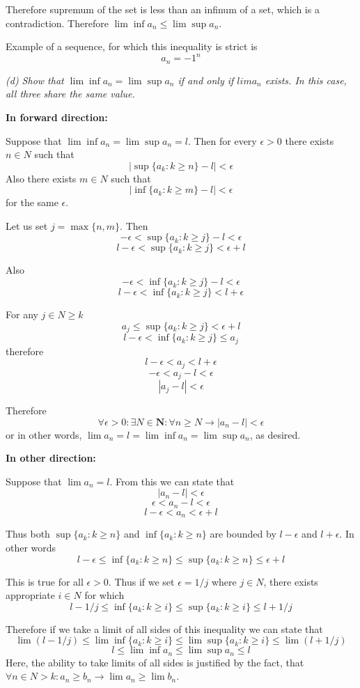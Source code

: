 \documentclass[11pt,oneside,titlepage]{book}
\begin{document}
Therefore supremum of the set is less than an infinum of a set, which is
a contradiction. Therefore $\lim\inf a_n \leq \lim \sup a_n$.

Example of a sequence, for which this inequality is strict is
$$a_n = -1^n$$

\textit{(d) Show that $\lim \inf a_n = \lim \sup a_n$ if and only if
  $lim a_n$ exists. In this case, all three share the same value.}

\textbf{In forward direction:}

Suppose that $\lim \inf a_n = \lim \sup a_n = l$. Then for every $\epsilon > 0$
there exists $n \in N$ such that
$$|\sup \{a_k: k \geq n\} - l| < \epsilon$$
Also there exists $m \in N$ such that 
$$|\inf \{a_k: k \geq m\} - l| < \epsilon$$
for the same $\epsilon$.

Let us set $j = \max\{n, m\}$. Then
$$-\epsilon < \sup \{a_k: k \geq j\} - l < \epsilon$$
$$ l - \epsilon < \sup \{a_k: k \geq j\} < \epsilon + l$$

Also
$$-\epsilon < \inf \{a_k: k \geq j\} - l < \epsilon$$
$$l - \epsilon < \inf \{a_k: k \geq j\} < l + \epsilon$$

For any $j \in N \geq k$
$$a_j \leq \sup \{a_k: k \geq j\} < \epsilon + l$$
$$l - \epsilon < \inf \{a_k: k \geq j\} \leq a_j$$
therefore
$$l - \epsilon < a_j < l + \epsilon$$
$$ - \epsilon < a_j - l <  \epsilon$$
$$|a_j - l| <  \epsilon$$

Therefore 
$$\forall \epsilon > 0: \exists N \in \textbf{N}: \forall n \geq N \to
|a_n - l| < \epsilon$$
or in other words, $\lim a_n = l = \lim \inf a_n = \lim \sup a_n$, as desired.

\textbf{In other direction: }

Suppose that $\lim a_n = l$. From this we can state that
$$|a_n - l| < \epsilon$$
$$ \epsilon < a_n - l < \epsilon$$
$$l - \epsilon < a_n  < \epsilon + l$$

Thus both $\sup \{a_k: k \geq n\}$ and $\inf \{a_k: k \geq n\}$
are bounded by $l - \epsilon$ and $l + \epsilon$. In other words
$$l - \epsilon \leq  \inf \{a_k: k \geq n\} \leq \sup \{a_k: k \geq n\} \leq \epsilon + l$$

This is true for all $\epsilon > 0$. Thus if we set $\epsilon = 1/j$
where $j \in N$, there exists appropriate $i \in N$ for which
$$l - 1/j \leq  \inf \{a_k: k \geq i\} \leq  \sup \{a_k: k \geq i\} \leq  l + 1/j$$

Therefore if we take a limit of all sides of this inequality  we can state that
$$\lim (l - 1/j) \leq  \lim \inf \{a_k: k \geq i\} \leq \lim \sup \{a_k: k \geq i\} \leq \lim( l + 1/j)$$
$$l \leq  \lim \inf a_n \leq \lim \sup a_n \leq l$$
Here, the ability to take limits of all sides is justified by the fact, that
$\forall n \in N > k: a_n \geq b_n \to \lim a_n \geq \lim b_n$.
\end{document}
